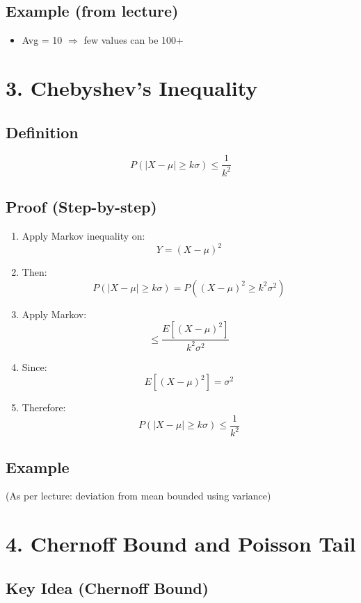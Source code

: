 \documentclass[11pt]{article}
\begin{document}
\subsection*{Example (from lecture)}

\begin{itemize}
\item Avg = 10 $\Rightarrow$ few values can be 100+
\end{itemize}

\section*{3. Chebyshev’s Inequality}

\subsection*{Definition}

\[
P(|X - \mu| \ge k\sigma) \le \frac{1}{k^2}
\]

\subsection*{Proof (Step-by-step)}

\begin{enumerate}
\item Apply Markov inequality on:
\[
Y = (X - \mu)^2
\]
\item Then:
\[
P(|X - \mu| \ge k\sigma) = P((X - \mu)^2 \ge k^2\sigma^2)
\]
\item Apply Markov:
\[
\le \frac{E[(X - \mu)^2]}{k^2\sigma^2}
\]
\item Since:
\[
E[(X - \mu)^2] = \sigma^2
\]
\item Therefore:
\[
P(|X - \mu| \ge k\sigma) \le \frac{1}{k^2}
\]
\end{enumerate}

\subsection*{Example}

(As per lecture: deviation from mean bounded using variance)

\section*{4. Chernoff Bound and Poisson Tail}

\subsection*{Key Idea (Chernoff Bound)}
\end{document}
